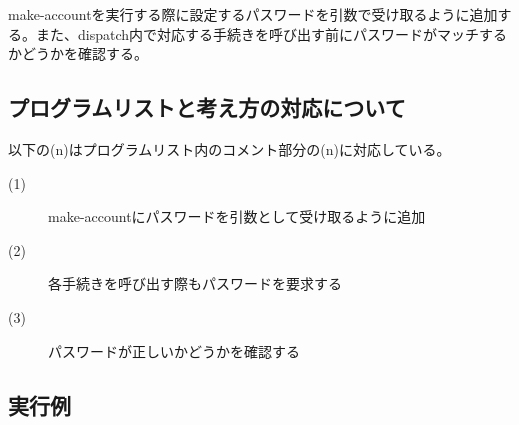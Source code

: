 \documentclass[a4paper,12pt]{article}
\begin{document}
make-accountを実行する際に設定するパスワードを引数で受け取るように追加する。また、dispatch内で対応する手続きを呼び出す前にパスワードがマッチするかどうかを確認する。

\subsection{プログラムリストと考え方の対応について}



以下の(n)はプログラムリスト内のコメント部分の(n)に対応している。

\begin{description}
    \item[(1)]make-accountにパスワードを引数として受け取るように追加
    \item[(2)]各手続きを呼び出す際もパスワードを要求する
    \item[(3)]パスワードが正しいかどうかを確認する
\end{description}

\subsection{実行例}


\end{document}
